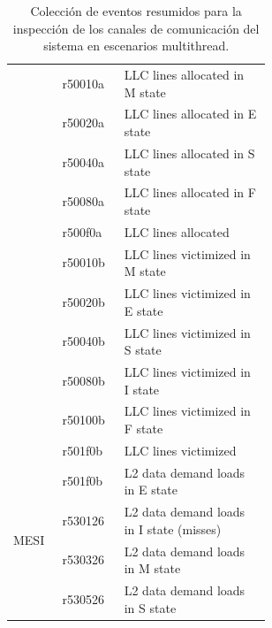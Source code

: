 \begin{table}[]
\begin{tabular}{|l|l|p{0.58\linewidth}|}
                                    & r50010a  & LLC lines allocated in M state                             \\ \cline{2-3} 
                                    & r50020a  & LLC lines allocated in E state                             \\ \cline{2-3} 
                                    & r50040a  & LLC lines allocated in S state                             \\ \cline{2-3} 
                                    & r50080a  & LLC lines allocated in F state                             \\ \cline{2-3} 
                                    & r500f0a  & LLC lines allocated                                        \\ \cline{2-3} 
                                    & r50010b  & LLC lines victimized in M state                            \\ \cline{2-3} 
                                    & r50020b  & LLC lines victimized in E state                            \\ \cline{2-3} 
                                    & r50040b  & LLC lines victimized in S state                            \\ \cline{2-3} 
                                    & r50080b  & LLC lines victimized in I state                            \\ \cline{2-3} 
                                    & r50100b  & LLC lines victimized in F state                            \\ \cline{2-3} 
                                    & r501f0b  & LLC lines victimized                                       \\ \hline
\multirow{4}{*}{MESI}               & r501f0b  & L2 data demand loads in E state                            \\ \cline{2-3} 
                                    & r530126  & L2 data demand loads in I state (misses)                   \\ \cline{2-3} 
                                    & r530326  & L2 data demand loads in M state                            \\ \cline{2-3} 
                                    & r530526  & L2 data demand loads in S state                            \\ \hline
\end{tabular}
\caption{Colección de eventos resumidos para la inspección de los canales de comunicación del sistema en escenarios multithread.}
\label{table:codigoseventos}
\end{table}

